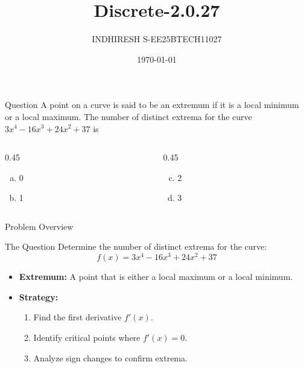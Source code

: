 \documentclass{beamer}
\title{Discrete-2.0.27}
\author{INDHIRESH S-EE25BTECH11027}
\date{\today}
\begin{document}
\begin{frame}
    \titlepage
\end{frame}

\begin{frame}{Question}
 A point on a curve is said to be an extremum if it is a local minimum or a local maximum. The number of distinct extrema for the curve $3x^4 -16x^3 + 24x^2 + 37 $ is

\begin{columns}[t]
    \begin{column}{0.45\textwidth}
        \begin{enumerate}[a)]
            \item 0
            \item 1
        \end{enumerate}
    \end{column}
    
    \begin{column}{0.45\textwidth}
        \begin{enumerate}[a)]
            \setcounter{enumi}{2} %
            \item 2
            \item 3
        \end{enumerate}
    \end{column}
\end{columns}
\end{frame}



\begin{frame}{Problem Overview}
    \begin{block}{The Question}
        Determine the number of distinct extrema for the curve:
        \[ f(x) = 3x^4 - 16x^3 + 24x^2 + 37 \]
    \end{block}
    
    \begin{itemize}
        \item \textbf{Extremum:} A point that is either a local maximum or a local minimum.
        \item \textbf{Strategy:}
        \begin{enumerate}
            \item Find the first derivative $f'(x)$.
            \item Identify critical points where $f'(x) = 0$.
            \item Analyze sign changes to confirm extrema.
        \end{enumerate}
    \end{itemize}
\end{frame}
\end{document}

